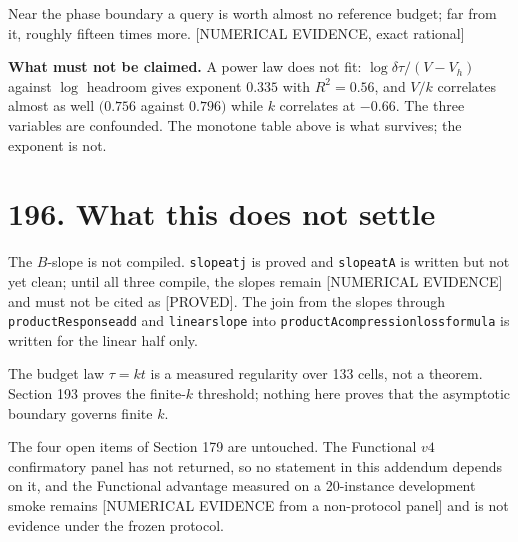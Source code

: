 \documentclass[9pt,twocolumn]{article}
\newcommand{\eclass}[1]{\textsf{[#1]}}
\renewcommand{\_}{\CIGunderscore\allowbreak}
\begin{document}
Near the phase boundary a query is worth almost no reference budget; far from it, roughly fifteen times more. \eclass{NUMERICAL EVIDENCE, exact rational}

\textbf{What must not be claimed.} A power law does not fit: $\log\delta\tau/(V-V_h)$ against $\log$ headroom gives exponent $0.335$ with $R^2=0.56$, and $V/k$ correlates almost as well $(0.756$ against $0.796)$ while $k$ correlates at $-0.66$. The three variables are confounded. The monotone table above is what survives; the exponent is not.

\section*{196. What this does not settle}

The $B$-slope is not compiled. \texttt{slope\_at\_j} is proved and \texttt{slope\_at\_A} is written but not yet clean; until all three compile, the slopes remain \eclass{NUMERICAL EVIDENCE} and must not be cited as \eclass{PROVED}. The join from the slopes through \texttt{productResponse\_add} and \texttt{linear\_slope} into \texttt{productA\_compression\_loss\_formula} is written for the linear half only.

The budget law $\tau=kt$ is a measured regularity over 133 cells, not a theorem. Section 193 proves the finite-$k$ threshold; nothing here proves that the asymptotic boundary governs finite $k$.

The four open items of Section 179 are untouched. The Functional $v4$ confirmatory panel has not returned, so no statement in this addendum depends on it, and the Functional advantage measured on a 20-instance development smoke remains \eclass{NUMERICAL EVIDENCE from a non-protocol panel} and is not evidence under the frozen protocol.
\end{document}
